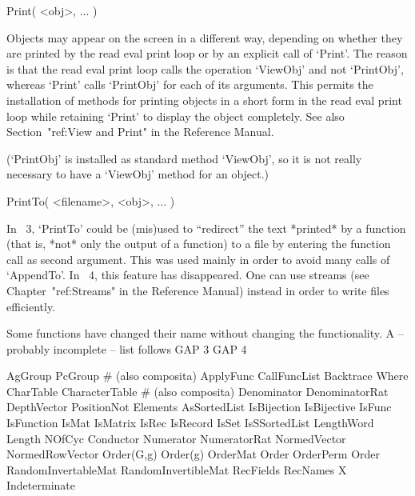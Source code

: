 \>Print( <obj>, ... )

Objects may appear on the screen in a different way,
depending on whether they are printed by the read eval print loop
or by an explicit call of `Print'.
The reason is that the read eval print loop calls the operation `ViewObj'
and not `PrintObj', whereas `Print' calls `PrintObj' for each of its
arguments.
This permits the installation of methods for printing objects in a short form
in the read eval print loop while retaining `Print' to display
the object completely.
See also Section~"ref:View and Print" in the Reference Manual.

(`PrintObj' is installed as standard method `ViewObj', so it is
not really necessary to have a `ViewObj' method for an object.)

\>PrintTo( <filename>, <obj>, ... )

In {\GAP}~3, `PrintTo' could be (mis)used to ``redirect'' the text
*printed* by a function (that is, *not* only the output of a function)
to a file by entering the function call as second argument.
This was used mainly in order to avoid many calls of `AppendTo'.
In {\GAP}~4, this feature has disappeared.
One can use streams (see Chapter~"ref:Streams" in the Reference Manual)
instead in order to write files efficiently.



Some functions have changed their name without changing the
functionality.
A -- probably incomplete -- list follows
\begintt
    GAP 3                   GAP 4

    AgGroup                 PcGroup            # (also composita)
    ApplyFunc               CallFuncList
    Backtrace               Where
    CharTable               CharacterTable     # (also composita)
    Denominator             DenominatorRat
    DepthVector             PositionNot
    Elements                AsSortedList
    IsBijection             IsBijective
    IsFunc                  IsFunction
    IsMat                   IsMatrix
    IsRec                   IsRecord
    IsSet                   IsSSortedList
    LengthWord              Length
    NOfCyc                  Conductor
    Numerator               NumeratorRat
    NormedVector            NormedRowVector
    Order(G,g)              Order(g)
    OrderMat                Order
    OrderPerm               Order
    RandomInvertableMat     RandomInvertibleMat
    RecFields               RecNames
    X                       Indeterminate
\endtt

